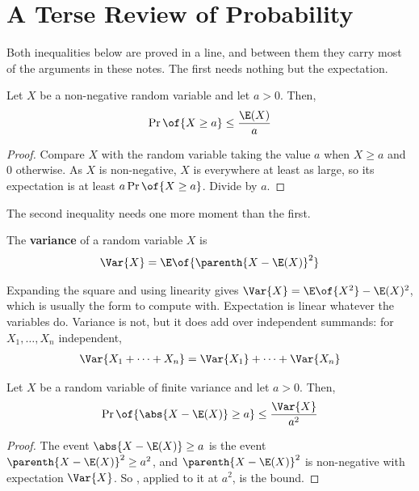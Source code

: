 \section{A Terse Review of Probability}

Both inequalities below are proved in a line, and between them they carry most of the arguments in these notes. The first needs nothing but the expectation.

\begin{boxtheorem} \label{Ch1:Thm:Markov}
    Let $X$ be a non-negative random variable and let $a > 0$. Then,
    \begin{align*}
        \Pr\of{X \geq a} \leq \frac{\E(X)}{a}
    \end{align*}
\end{boxtheorem}
\begin{proof}
    Compare $X$ with the random variable taking the value $a$ when $X \geq a$ and $0$ otherwise. As $X$ is non-negative, $X$ is everywhere at least as large, so its expectation is at least $a \Pr\of{X \geq a}$. Divide by $a$.
\end{proof}

The second inequality needs one more moment than the first.

\begin{boxdefinition}[Variance]
    The \textbf{variance} of a random variable $X$ is
    \begin{align*}
        \Var{X} = \E\of{\parenth{X - \E(X)}^2}
    \end{align*}
\end{boxdefinition}

Expanding the square and using linearity gives $\Var{X} = \E\of{X^2} - \E(X)^2$, which is usually the form to compute with. Expectation is linear whatever the variables do. Variance is not, but it does add over independent summands: for $X_1, \ldots, X_n$ independent,
\begin{align*}
    \Var{X_1 + \cdots + X_n} = \Var{X_1} + \cdots + \Var{X_n}
\end{align*}

\begin{boxtheorem} \label{Ch1:Thm:Chebyshev}
    Let $X$ be a random variable of finite variance and let $a > 0$. Then,
    \begin{align*}
        \Pr\of{\abs{X - \E(X)} \geq a} \leq \frac{\Var{X}}{a^2}
    \end{align*}
\end{boxtheorem}
\begin{proof}
    The event $\abs{X - \E(X)} \geq a$ is the event $\parenth{X - \E(X)}^2 \geq a^2$, and $\parenth{X - \E(X)}^2$ is non-negative with expectation $\Var{X}$. So , applied to it at $a^2$, is the bound.
\end{proof}

